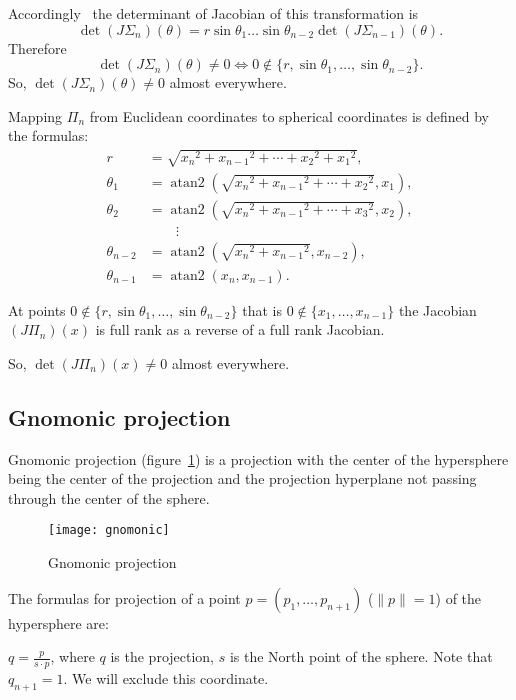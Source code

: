 \documentclass[oneside,draft]{amsart}
\newcommand{\norm}[1]{\lVert #1\rVert}
\begin{document}
Accordingly~\cite{polar-jacobian} the determinant of Jacobian of this transformation is
\[ \det (J\Sigma_n)(\theta) = r\sin\theta_1\dots\sin\theta_{n-2}\det (J\Sigma_{n-1})(\theta). \]
Therefore
\[
\det (J\Sigma_n)(\theta)\ne 0\Leftrightarrow 0\notin\{r,\sin\theta_1,\dots,\sin\theta_{n-2}\}.
\]
So, $\det (J\Sigma_n)(\theta)\ne 0$ almost everywhere.

Mapping $\Pi_n$ from Euclidean coordinates to spherical coordinates is defined by the formulas:
\[
\begin{aligned}r&={\textstyle {\sqrt {{x_{n}}^{2}+{x_{n-1}}^{2}+\cdots +{x_{2}}^{2}+{x_{1}}^{2}}}},\\\theta _{1}&=\operatorname {atan2} \left({\textstyle {\sqrt {{x_{n}}^{2}+{x_{n-1}}^{2}+\cdots +{x_{2}}^{2}}}},x_{1}\right),\\\theta _{2}&=\operatorname {atan2} \left({\textstyle {\sqrt {{x_{n}}^{2}+{x_{n-1}}^{2}+\cdots +{x_{3}}^{2}}}},x_{2}\right),\\&\qquad \vdots \\\theta _{n-2}&=\operatorname {atan2} \left({\textstyle {\sqrt {{x_{n}}^{2}+{x_{n-1}}^{2}}}},x_{n-2}\right),\\\theta _{n-1}&=\operatorname {atan2} \left(x_{n},x_{n-1}\right).\end{aligned}
\]  

At points $0\notin\{r,\sin\theta_1,\dots,\sin\theta_{n-2}\}$ that is $0\notin\{x_1,\dots,x_{n-1}\}$ the Jacobian $(J\Pi_n)(x)$
is full rank as a reverse of a full rank Jacobian.

So, $\det (J\Pi_n)(x)\ne 0$ almost everywhere.

\subsection{Gnomonic projection}

Gnomonic projection (figure~\ref{fig:gnomonic}) is a projection with the center of the hypersphere being the center of the projection and the projection hyperplane not passing through the center of the sphere.

\begin{figure}[hbt]
    \centering
    \texttt{[image: gnomonic]}
    \caption{Gnomonic projection}
    \label{fig:gnomonic}
\end{figure}

The formulas for projection of a point $p=(p_1,\dots,p_{n+1})$ ($\norm{p} = 1$) of the hypersphere are:

$q=\frac{p}{s\cdot p}$, where $q$ is the projection, $s$ is the North point of the sphere. Note that $q_{n+1}=1$. We will exclude this coordinate.
\end{document}
